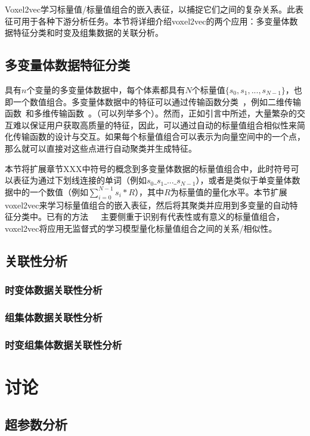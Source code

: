Voxel2vec学习标量值/标量值组合的嵌入表征，以捕捉它们之间的复杂关系。此表征可用于各种下游分析任务。本节将详细介绍voxel2vec的两个应用：多变量体数据特征分类和时变及组集数据的关联分析。

\subsection{多变量体数据特征分类}

具有$n$个变量的多变量体数据中，每个体素都具有$N$个标量值$\{s_0, s_1, ..., s_{N-1}\}$，也即一个数值组合。多变量体数据中的特征可以通过传输函数分类~\cite{LJUNG:2016:SOT}，例如二维传输函数~\cite{ZHOU:2012:TFC}和多维传输函数~\cite{GUO:2012:SMV}。（可以列举多个）。然而，正如引言中所述，大量繁杂的交互难以保证用户获取高质量的特征，因此，可以通过自动的标量值组合相似性来简化传输函数的设计与交互。如果每个标量值组合可以表示为向量空间中的一个点，那么就可以直接对这些点进行自动聚类并生成特征。

本节将扩展章节XXX中符号的概念到多变量体数据的标量值组合中，此时符号可以表征为通过下划线连接的单词（例如$s_{0}\_s_{1}\_...\_s_{N-1}$），或者是类似于单变量体数据中的一个数值（例如$\sum_{i=0}^{N-1}s_i*R$），其中$R$为标量值的量化水平。本节扩展voxel2vec来学习标量值组合的嵌入表征，然后将其聚类并应用到多变量的自动特征分类中。已有的方法~\cite{GUO:2012:SMV}~\cite{LIU:2015:AAF}~\cite{LU:2017:MVD}主要侧重于识别有代表性或有意义的标量值组合，voxel2vec将应用无监督式的学习模型量化标量值组合之间的关系/相似性。


\subsection{关联性分析}
\subsubsection{时变体数据关联性分析}
\subsubsection{组集体数据关联性分析}
\subsubsection{时变组集体数据关联性分析}

\section{讨论}
\subsection{超参数分析}
